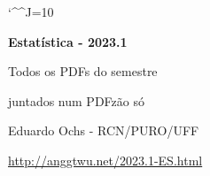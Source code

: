\documentclass[oneside,12pt]{article}
\begin{document}

\def\u#1{\par{\footnotesize \url{#1}}}

\def\drafturl{http://anggtwu.net/LATEX/2023-1-ES.pdf}
\def\drafturl{http://anggtwu.net/2023.1-ES.html}
\def\draftfooter{\tiny \href{\drafturl}{\jobname{}} \ColorBrown{\shorttoday{} \hours}}

\catcode`\^^J=10
\pu



%

\thispagestyle{empty}

\begin{center}

\vspace*{1.2cm}

{\bf \Large Estatística - 2023.1}

\bsk

Todos os PDFs do semestre

juntados num PDFzão só

\bsk

Eduardo Ochs - RCN/PURO/UFF

\url{http://anggtwu.net/2023.1-ES.html}

\end{center}

\newpage






\writetoc   %

\end{document}
